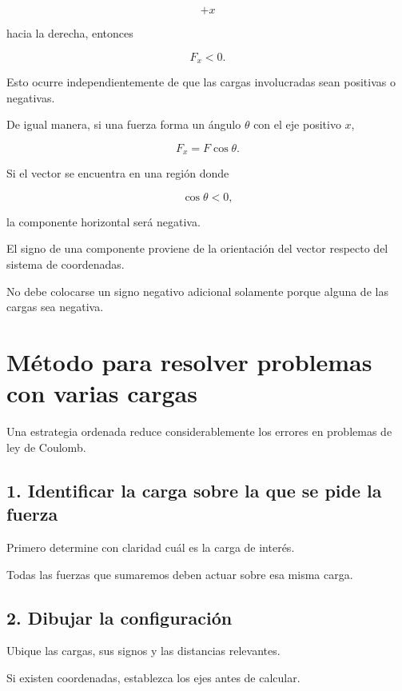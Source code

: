 \[
+x
\]

hacia la derecha, entonces

\[
F_x<0.
\]

Esto ocurre independientemente de que las cargas involucradas sean positivas
o negativas.

De igual manera, si una fuerza forma un ángulo \(\theta\) con el eje positivo
\(x\),

\[
F_x=F\cos\theta.
\]

Si el vector se encuentra en una región donde

\[
\cos\theta<0,
\]

la componente horizontal será negativa.

\begin{idea}

El signo de una componente proviene de la orientación del vector respecto del
sistema de coordenadas.

No debe colocarse un signo negativo adicional solamente porque alguna de las
cargas sea negativa.

\end{idea}



\section{Método para resolver problemas con varias cargas}

Una estrategia ordenada reduce considerablemente los errores en problemas de
ley de Coulomb.

\subsection{1. Identificar la carga sobre la que se pide la fuerza}

Primero determine con claridad cuál es la carga de interés.

Todas las fuerzas que sumaremos deben actuar sobre esa misma carga.

\subsection{2. Dibujar la configuración}

Ubique las cargas, sus signos y las distancias relevantes.

Si existen coordenadas, establezca los ejes antes de calcular.

